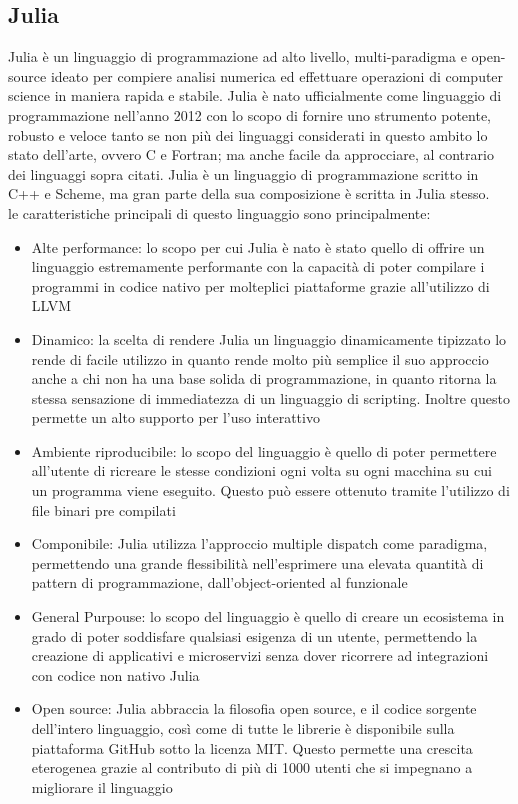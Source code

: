 \subsection{Julia}

Julia è un linguaggio di programmazione ad alto livello, multi-paradigma e open-source 
ideato per compiere analisi numerica ed effettuare operazioni di computer science in maniera rapida e stabile. 
Julia è nato ufficialmente come linguaggio di programmazione nell’anno 2012 con 
lo scopo di fornire uno strumento potente, robusto e veloce tanto se non più dei 
linguaggi considerati in questo ambito lo stato dell’arte, ovvero C e Fortran;  
ma anche facile da approcciare, al contrario dei linguaggi sopra citati. 
Julia è un linguaggio di programmazione scritto in C++ e Scheme, ma gran parte della 
sua composizione è scritta in Julia stesso.
\\

le caratteristiche principali di questo linguaggio sono principalmente:
\begin{itemize}
    \item Alte performance: lo scopo per cui Julia è nato è stato quello di offrire un 
    linguaggio estremamente performante con la capacità di poter compilare i 
    programmi in codice nativo per molteplici piattaforme grazie all’utilizzo di LLVM
    \item Dinamico: la scelta di rendere Julia un linguaggio dinamicamente tipizzato 
    lo rende di facile utilizzo in quanto rende molto più semplice il suo approccio anche a 
    chi non ha una base solida di programmazione, in quanto ritorna la stessa sensazione di 
    immediatezza di un linguaggio di scripting. Inoltre questo permette un alto supporto per 
    l’uso interattivo
    \item Ambiente riproducibile: lo scopo del linguaggio è quello di poter permettere 
    all’utente di ricreare le stesse condizioni ogni volta su ogni macchina su cui un programma viene eseguito. 
    Questo può essere ottenuto tramite l’utilizzo di file binari pre compilati
    \item Componibile: Julia utilizza l’approccio multiple dispatch come paradigma, 
    permettendo una grande flessibilità nell’esprimere una elevata quantità di pattern di programmazione, 
    dall’object-oriented al funzionale
    \item General Purpouse: lo scopo del linguaggio è quello di creare un ecosistema 
    in grado di poter soddisfare qualsiasi esigenza di un utente, permettendo la creazione 
    di applicativi e microservizi senza dover ricorrere ad integrazioni con codice non nativo Julia
    \item Open source: Julia abbraccia la filosofia open source, e il codice sorgente dell’intero linguaggio, 
    così come di tutte le librerie è disponibile sulla piattaforma GitHub sotto la licenza MIT. 
    Questo permette una crescita eterogenea grazie al contributo di più di 1000 utenti che si 
    impegnano a migliorare il linguaggio
\end{itemize}

